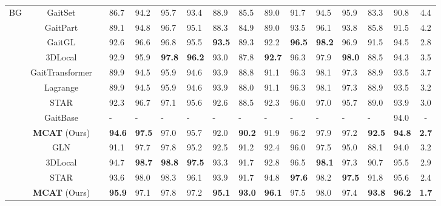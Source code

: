 \documentclass[journal]{IEEEtran}
\begin{document}
\begin{table*}[t]
\begin{center}
\begin{tabular}{|c|c|c| l l l l l l l l l l l|l|c|}
\multirow{7}{*}{BG} & GaitSet \cite{chao2021gaitset} &  & 86.7 & 94.2 & 95.7 & 93.4 & 88.9 & 85.5 & 89.0 & 91.7 & 94.5 & 95.9 & 83.3 & 90.8 & 4.4 \\
& GaitPart \cite{fan2020gaitpart} &  & 89.1 & 94.8 &96.7& 95.1& 88.3& 84.9 &89.0 &93.5 &96.1 &93.8& 85.8& 91.5 & 4.2 \\
& GaitGL \cite{GaitGL} &  & 92.6 & 96.6 & 96.8 & 95.5 & \textbf{93.5} & 89.3 & 92.2 & \textbf{96.5} & \textbf{98.2} & 96.9 & 91.5 & 94.5 & 2.8\\
& 3DLocal \cite{local3D} &  & 92.9 & 95.9 & \textbf{97.8} & \textbf{96.2} & 93.0 & 87.8 & \textbf{92.7} & 96.3 & 97.9 & \textbf{98.0} & 88.5 & 94.3 & 3.5 \\
& GaitTransformer \cite{cui2022gaittransformer} &  & 89.9 & 94.5 & 95.9 & 94.6 & 93.9 & 88.8 & 91.1 & 96.3 & 98.1 & 97.3 & 88.9 & 93.5 & 3.7 \\
& Lagrange \cite{chai2022lagrange} &  & 89.9 & 94.5 & 95.9 & 94.6 & 93.9 & 88.0 & 91.1 & 96.3 & 98.1 & 97.3 & 88.9 & 93.5 & 3.2 \\
& STAR \cite{huang2022star} &  & 92.3 & 96.7 & 97.1 & 95.6 & 92.6 & 88.5 & 92.3 & 96.0 & 97.0 & 95.7 & 89.0 & 93.9 & 3.0 \\
& GaitBase \cite{fan2023opengait} &  & - & - & - & - & - & - & - & - & - & - & - & 94.0 & - \\
& \textbf{MCAT} (Ours) &  & \textbf{94.6} & \textbf{97.5} & 97.0 & 95.7 & 92.0 & \textbf{90.2} & 91.9 & 96.2 & 97.9 & 97.2 & \textbf{92.5} & \textbf{94.8} & \textbf{2.7} \\\cline{2-16}

& GLN \cite{hou2020gait} &  & 91.1 & 97.7 & 97.8 & 95.2 & 92.5 & 91.2 & 92.4 & 96.0 & 97.5 & 95.0 & 88.1 & 94.0 & 3.2 \\
& 3DLocal \cite{local3D} &  & 94.7 & \textbf{98.7} & \textbf{98.8} & \textbf{97.5} & 93.3 & 91.7 & 92.8 & 96.5 & \textbf{98.1} & 97.3 & 90.7 & 95.5 & 2.9 \\
& STAR \cite{huang2022star} &  & 93.6 & 98.0 & 98.3 & 96.1 & 93.9 & 91.7 & 94.8 & \textbf{97.6} & 98.2 & \textbf{97.5} & 91.8 & 95.6 & 2.4 \\
& \textbf{MCAT} (Ours) &  &\textbf{95.9} & 97.1 & 97.8 & 97.2 & \textbf{95.1} & \textbf{93.0} & \textbf{96.1} & 97.5 & 98.0 & 97.4 & \textbf{93.8} & \textbf{96.2} & \textbf{1.7} \\\hline


\end{tabular}
\end{center}
\end{table*}
\end{document}
